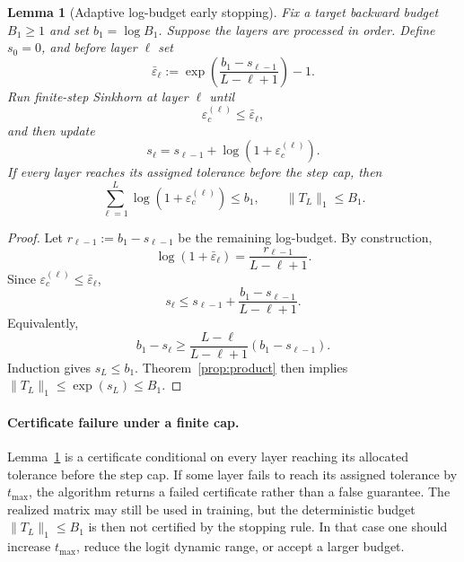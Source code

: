 \documentclass[11pt]{article}
\numberwithin{equation}{section}
\theoremstyle{plain}
\newtheorem{lemma}[theorem]{Lemma}
\theoremstyle{definition}
\theoremstyle{remark}
\begin{document}
\begin{lemma}[Adaptive log-budget early stopping]\label{lem:adaptive-budget}
Fix a target backward budget $B_1\ge1$ and set $b_1=\log B_1$. Suppose the layers are processed in order. Define $s_0=0$, and before layer $\ell$ set
\begin{equation}\label{eq:adaptive-budget-target}
        \bar\varepsilon_\ell
        :=
        \exp\!\left(\frac{b_1-s_{\ell-1}}{L-\ell+1}\right)-1.
\end{equation}
Run finite-step Sinkhorn at layer $\ell$ until
\begin{equation}
        \varepsilon_c^{(\ell)}\le \bar\varepsilon_\ell,
\end{equation}
and then update
\begin{equation}
        s_\ell=s_{\ell-1}+\log(1+\varepsilon_c^{(\ell)}).
\end{equation}
If every layer reaches its assigned tolerance before the step cap, then
\begin{equation}
        \sum_{\ell=1}^L\log(1+\varepsilon_c^{(\ell)})\le b_1,
        \qquad
        \|T_L\|_1\le B_1.
\end{equation}
\end{lemma}

\begin{proof}
Let $r_{\ell-1}:=b_1-s_{\ell-1}$ be the remaining log-budget. By construction,
\[
        \log(1+\bar\varepsilon_\ell)=\frac{r_{\ell-1}}{L-\ell+1}.
\]
Since $\varepsilon_c^{(\ell)}\le\bar\varepsilon_\ell$,
\[
        s_\ell
        \le
        s_{\ell-1}+\frac{b_1-s_{\ell-1}}{L-\ell+1}.
\]
Equivalently,
\[
        b_1-s_\ell
        \ge
        \frac{L-\ell}{L-\ell+1}(b_1-s_{\ell-1}).
\]
Induction gives $s_L\le b_1$. Theorem~\ref{prop:product} then implies $\|T_L\|_1\le\exp(s_L)\le B_1$.
\end{proof}

\paragraph{Certificate failure under a finite cap.}
Lemma~\ref{lem:adaptive-budget} is a certificate conditional on every layer
reaching its allocated tolerance before the step cap.  If some layer fails to
reach its assigned tolerance by \(t_{\max}\), the algorithm returns a failed
certificate rather than a false guarantee.  The realized matrix may still be
used in training, but the deterministic budget \(\|T_L\|_1\le B_1\) is then not
certified by the stopping rule.  In that case one should increase \(t_{\max}\),
reduce the logit dynamic range, or accept a larger budget.
\end{document}
